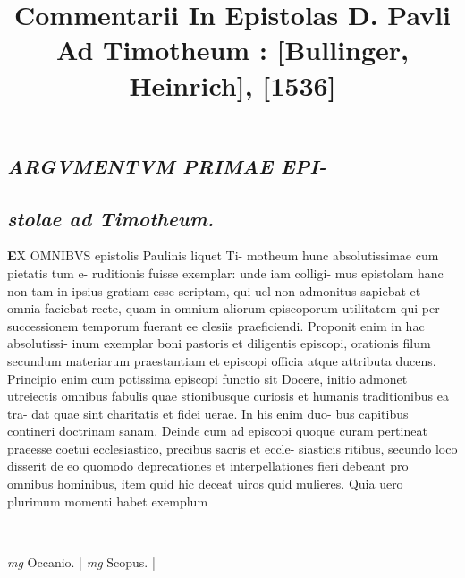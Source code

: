 \documentclass{article}
\begin{document}
\date{}
        \title{Commentarii In Epistolas D. Pavli Ad Timotheum : [Bullinger, Heinrich], [1536]}
\maketitle
\tableofcontents
\clearpage
\begin{pages} 
\beginnumbering
        
\marginpar{[ p.92 ]}
{}
\subsection*{\textit{ARGVMENTVM PRIMAE EPI- }}
{}
\subsection*{\textit{stolae ad Timotheum. }}\pstart \huge\textbf{E}\normalsize X OMNIBVS epistolis Paulinis liquet Ti- motheum hunc absolutissimae cum pietatis tum e- ruditionis fuisse exemplar: unde iam colligi- mus epistolam hanc non tam in ipsius gratiam esse seriptam, qui uel non admonitus sapiebat et omnia faciebat recte, quam in omnium aliorum episcoporum utilitatem qui per successionem temporum fuerant ee clesiis praeficiendi. Proponit enim in hac absolutissi- inum exemplar boni pastoris et diligentis episcopi, orationis filum secundum materiarum praestantiam et episcopi officia atque attributa ducens.  \pend\pstart Principio enim cum potissima episcopi functio sit Docere, initio admonet utreiectis omnibus fabulis quae stionibusque curiosis et humanis traditionibus ea tra- dat quae sint charitatis et fidei uerae. In his enim duo- bus capitibus contineri doctrinam sanam.  \pend\pstart Deinde cum ad episcopi quoque curam pertineat praeesse coetui ecclesiastico, precibus sacris et eccle- siasticis ritibus, secundo loco disserit de eo quomodo deprecationes et interpellationes fieri debeant pro omnibus hominibus, item quid hic deceat uiros quid mulieres.  \pend\pstart Quia uero plurimum momenti habet exemplum  \pend
\vspace{0.5cm}\noindent
\vspace{0.2cm}\rule{1cm}{0.2pt}\\ 
\hspace{0.2cm}\textit{mg}
\footnotesize Occanio. 
\normalsize| 
\hspace{0.2cm}\textit{mg}
\footnotesize Scopus. 
\normalsize| 

\end{pages}
\end{document}
